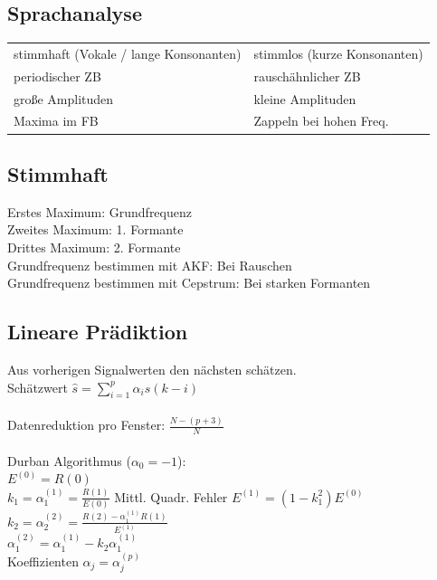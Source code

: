 \documentclass[fs, footer]{latex4ei}
\begin{document}
\begin{multicols*}{4}
\section{Sprachanalyse}
	\begin{tabular}{ll}
	stimmhaft (Vokale / lange Konsonanten) & stimmlos (kurze Konsonanten)\\
	periodischer ZB & rauschähnlicher ZB\\
	große Amplituden & kleine Amplituden\\
	Maxima im FB & Zappeln bei hohen Freq.\\
	
	
	\end{tabular}
	

	\subsection{Stimmhaft}
	Erstes Maximum: Grundfrequenz\\
	Zweites Maximum: 1. Formante\\
	Drittes Maximum: 2. Formante\\

	Grundfrequenz bestimmen mit AKF: Bei Rauschen\\
	Grundfrequenz bestimmen mit Cepstrum: Bei starken Formanten\\



	\subsection{Lineare Prädiktion}
	Aus vorherigen Signalwerten den nächsten schätzen.\\
	Schätzwert $\hat s = \sum\limits_{i = 1}^p \alpha_i s(k-i)$\\
	\\
	Datenreduktion pro Fenster: $\frac{N - (p+3)}{N}$\\
	\\
	Durban Algorithmus ($\alpha_0 = -1$):\\
	$E^{(0)} = R(0)$\\
	$k_1 = \alpha_1^{(1)} = \frac{R(1)}{E(0)}$ \qquad Mittl. Quadr. Fehler $E^{(1)} = (1-k_1^2)E^{(0)}$ \\
	$k_2 = \alpha_2^{(2)} = \frac{R(2) - \alpha_1^{(1)} R(1)}{E^{(1)}}$\\
	$\alpha_1^{(2)} = \alpha_1^{(1)} - k_2 \alpha_1^{(1)}$\\
	Koeffizienten $\alpha_j = \alpha_j^{(p)}$



\end{multicols*}
\end{document}

